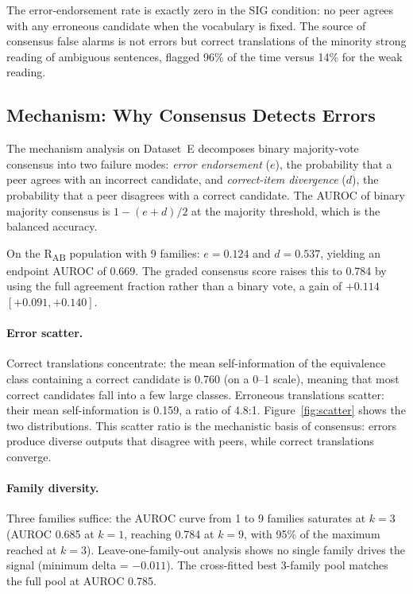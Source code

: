 \documentclass[11pt,letterpaper]{article}
\begin{document}
The error-endorsement rate is exactly zero in the SIG condition: no peer agrees with any erroneous candidate when the vocabulary is fixed. The source of consensus false alarms is not errors but correct translations of the minority strong reading of ambiguous sentences, flagged 96\% of the time versus 14\% for the weak reading.

\subsection{Mechanism: Why Consensus Detects Errors}

The mechanism analysis on Dataset~E decomposes binary majority-vote consensus into two failure modes: \emph{error endorsement} ($e$), the probability that a peer agrees with an incorrect candidate, and \emph{correct-item divergence} ($d$), the probability that a peer disagrees with a correct candidate. The AUROC of binary majority consensus is $1 - (e + d)/2$ at the majority threshold, which is the balanced accuracy.

On the R\textsubscript{AB} population with 9 families: $e = 0.124$ and $d = 0.537$, yielding an endpoint AUROC of 0.669. The graded consensus score raises this to 0.784 by using the full agreement fraction rather than a binary vote, a gain of $+0.114$ $[+0.091, +0.140]$.

\paragraph{Error scatter.}
Correct translations concentrate: the mean self-information of the equivalence class containing a correct candidate is 0.760 (on a 0--1 scale), meaning that most correct candidates fall into a few large classes. Erroneous translations scatter: their mean self-information is 0.159, a ratio of 4.8:1. Figure~\ref{fig:scatter} shows the two distributions. This scatter ratio is the mechanistic basis of consensus: errors produce diverse outputs that disagree with peers, while correct translations converge.

\paragraph{Family diversity.}
Three families suffice: the AUROC curve from 1 to 9 families saturates at $k = 3$ (AUROC 0.685 at $k = 1$, reaching 0.784 at $k = 9$, with 95\% of the maximum reached at $k = 3$). Leave-one-family-out analysis shows no single family drives the signal (minimum delta = $-0.011$). The cross-fitted best 3-family pool matches the full pool at AUROC 0.785.
\end{document}
